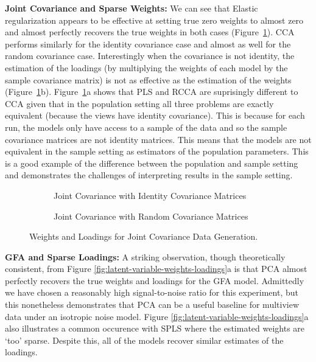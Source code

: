 \textbf{Joint Covariance and Sparse Weights:} We can see that Elastic regularization appears to be effective at setting true zero weights to almost zero and almost perfectly recovers the true weights in both cases (Figure~\ref{fig:joint-identity-weights-loadings}).
CCA performs similarly for the identity covariance case and almost as well for the random covariance case.
Interestingly when the covariance is not identity, the estimation of the loadings (by multiplying the weights of each model by the sample covariance matrix) is not as effective as the estimation of the weights (Figure~\ref{fig:joint-identity-weights-loadings}b).
Figure~\ref{fig:joint-identity-weights-loadings}a shows that PLS and RCCA are suprisingly different to CCA given that in the population setting all three problems are exactly equivalent (because the views have identity covariance).
This is because for each run, the models only have access to a sample of the data and so the sample covariance matrices are not identity matrices.
This means that the models are not equivalent in the sample setting as estimators of the population parameters.
This is a good example of the difference between the population and sample setting and demonstrates the challenges of interpreting results in the sample setting.

\begin{figure}
\centering
\begin{subfigure}{0.49\linewidth}
\centering

\caption{Joint Covariance with Identity Covariance Matrices}
\end{subfigure}
%
\begin{subfigure}{0.49\linewidth}
\centering

\caption{Joint Covariance with Random Covariance Matrices}
\end{subfigure}
\caption{Weights and Loadings for Joint Covariance Data Generation.}
\label{fig:joint-identity-weights-loadings}
\end{figure}

\textbf{GFA and Sparse Loadings:} A striking observation, though theoretically consistent, from Figure \ref{fig:latent-variable-weights-loadings}a is that PCA almost perfectly recovers the true weights and loadings for the GFA model.
Admittedly we have chosen a reasonably high signal-to-noise ratio for this experiment, but this nonetheless demonstrates that PCA can be a useful baseline for multiview data under an isotropic noise model.
Figure \ref{fig:latent-variable-weights-loadings}a also illustrates a common occurence with SPLS where the estimated weights are `too' sparse.
Despite this, all of the models recover similar estimates of the loadings.

